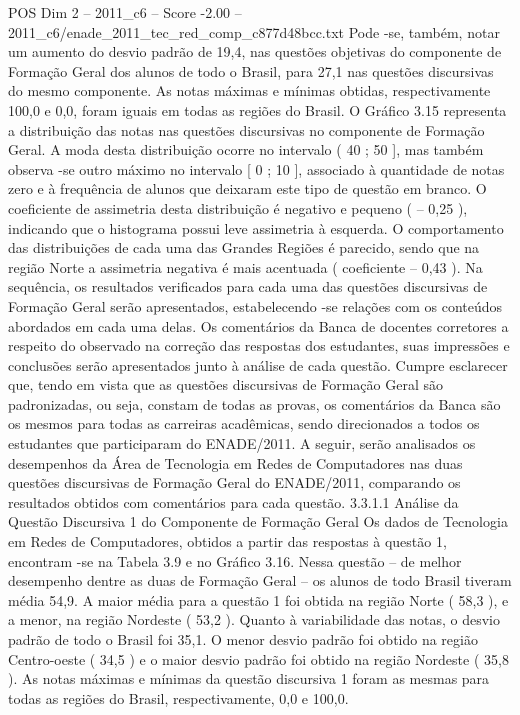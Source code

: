 \begin{textsample}{POS Dim 2 – 2011\_c6 – Score -2.00 – 2011\_c6/enade\_2011\_tec\_red\_comp\_c877d48bcc.txt}
Pode -se, também, notar um aumento do desvio padrão de 19,4, nas questões objetivas do componente de Formação Geral dos alunos de todo o Brasil, para 27,1 nas questões discursivas do mesmo componente.
As notas máximas e mínimas obtidas, respectivamente 100,0 e 0,0, foram iguais em todas as regiões do Brasil.
O Gráfico 3.15 representa a distribuição das notas nas questões discursivas no componente de Formação Geral.
A moda desta distribuição ocorre no intervalo ( 40 ; 50 ], mas também observa -se outro máximo no intervalo [ 0 ; 10 ], associado à quantidade de notas zero e à frequência de alunos que deixaram este tipo de questão em branco.
O coeficiente de assimetria desta distribuição é negativo e pequeno ( – 0,25 ), indicando que o histograma possui leve assimetria à esquerda.
O comportamento das distribuições de cada uma das Grandes Regiões é parecido, sendo que na região Norte a assimetria negativa é mais acentuada ( coeficiente – 0,43 ).
Na sequência, os resultados verificados para cada uma das questões discursivas de Formação Geral serão apresentados, estabelecendo -se relações com os conteúdos abordados em cada uma delas.
Os comentários da Banca de docentes corretores a respeito do observado na correção das respostas dos estudantes, suas impressões e conclusões serão apresentados junto à análise de cada questão.
Cumpre esclarecer que, tendo em vista que as questões discursivas de Formação Geral são padronizadas, ou seja, constam de todas as provas, os comentários da Banca são os mesmos para todas as carreiras acadêmicas, sendo direcionados a todos os estudantes que participaram do ENADE/2011.
A seguir, serão analisados os desempenhos da Área de Tecnologia em Redes de Computadores nas duas questões discursivas de Formação Geral do ENADE/2011, comparando os resultados obtidos com comentários para cada questão. 3.3.1.1 Análise da Questão Discursiva 1 do Componente de Formação Geral Os dados de Tecnologia em Redes de Computadores, obtidos a partir das respostas à questão 1, encontram -se na Tabela 3.9 e no Gráfico 3.16.
Nessa questão – de melhor desempenho dentre as duas de Formação Geral – os alunos de todo Brasil tiveram média 54,9.
A maior média para a questão 1 foi obtida na região Norte ( 58,3 ), e a menor, na região Nordeste ( 53,2 ).
Quanto à variabilidade das notas, o desvio padrão de todo o Brasil foi 35,1.
O menor desvio padrão foi obtido na região Centro-oeste ( 34,5 ) e o maior desvio padrão foi obtido na região Nordeste ( 35,8 ).
As notas máximas e mínimas da questão discursiva 1 foram as mesmas para todas as regiões do Brasil, respectivamente, 0,0 e 100,0.

\end{textsample}
